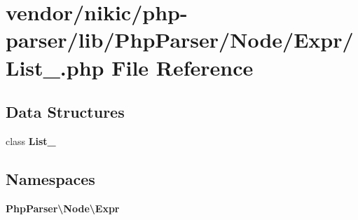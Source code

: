 \section{vendor/nikic/php-\/parser/lib/\+Php\+Parser/\+Node/\+Expr/\+List\+\_\+.php File Reference}
\label{_list___8php}
\subsection*{Data Structures}
\begin{DoxyCompactItemize}
\item 
class {\bf List\+\_\+}
\end{DoxyCompactItemize}
\subsection*{Namespaces}
\begin{DoxyCompactItemize}
\item 
 {\bf Php\+Parser\textbackslash{}\+Node\textbackslash{}\+Expr}
\end{DoxyCompactItemize}
